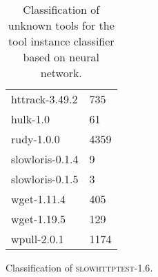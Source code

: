 \begin{table}[H]
\begin{subtable}{.45\linewidth}
\begin{tabular}{ll}
		httrack-3.49.2 & 735\\
		hulk-1.0 & 61\\
		rudy-1.0.0 & 4359\\
		slowloris-0.1.4 & 9\\
		slowloris-0.1.5 & 3\\
		wget-1.11.4 & 405\\
		wget-1.19.5 & 129\\
		wpull-2.0.1 & 1174\\
		\bottomrule
	\end{tabular}
	\caption{Classification of \textsc{slowhttptest-1.6}.}
	\end{subtable}
	\caption{Classification of unknown tools for the tool instance classifier based on neural network.}
	\label{tab:unknown_application_long_neural_network}
\end{table}
